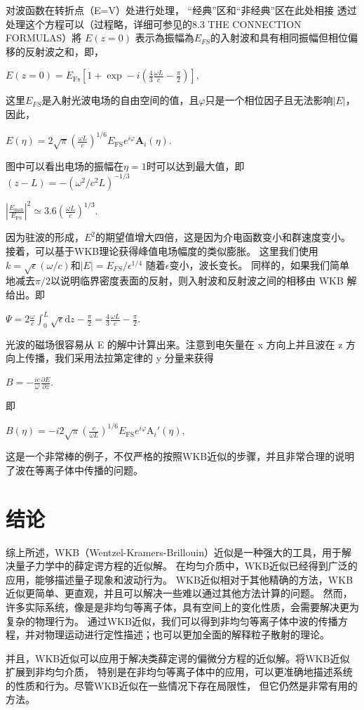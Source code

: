 \documentclass[12pt]{article}
\begin{document}
对波函数在转折点（E=V）处进行处理， “经典”区和“非经典”区在此处相接
透过处理这个方程可以（过程略，详细可参见\cite{griffiths_schroeter_2018}的8.3 THE CONNECTION FORMULAS）將 $E(z = 0)$ 表示為振幅為$E_{FS}$的入射波和具有相同振幅但相位偏移的反射波之和，即，
\begin{center}
    $\displaystyle E(z=0)=E_{\text{Fs}}\left[1+\exp-i\left(\frac{4}{3}\frac{\omega L}{c}-\frac{\pi}{2}\right)\right],$
\end{center}
这里$E_{FS}$是入射光波电场的自由空间的值，且$\varphi$只是一个相位因子且无法影响$|E|$，因此，
\begin{center}
    $\displaystyle E(\eta)=2\sqrt{\pi}\left(\frac{\omega L}{c}\right)^{1/6}E_{\text{FS}}e^{i\varphi}\mathbf{A}_i(\eta).$
\end{center}
图中可以看出电场的振幅在$\eta = 1$时可以达到最大值，即$(z-L) = -(\omega^2/c^2L)^{-1/3}$
\begin{center}
    $\displaystyle \left|\frac{E_{\max}}{E_{\text{FS}}}\right|^2\simeq3.6\left(\frac{\omega L}{c}\right)^{1/3}.$
\end{center}
因为驻波的形成，$E^2$的期望值增大四倍，这是因为介电函数变小和群速度变小。
接着，可以基于WKB理论获得峰值电场幅度的类似膨胀。 这里我们使用$k = \sqrt{\epsilon}(\omega/c)$和$|E| = E_{FS}/\epsilon^{1/4}$
随着$\epsilon$变小，波长变长。 
同样的，如果我们简单地减去$\pi/2$以说明临界密度表面的反射，则入射波和反射波之间的相移由 WKB 解给出。即
\begin{center}
    $\displaystyle \Psi=2\frac{\omega}{c}\int_{0}^{L}\sqrt{\epsilon}\mathrm{d}z-\frac{\pi}{2}=\frac{4}{3}\frac{\omega L}{c}-\frac{\pi}{2}.$
\end{center}

光波的磁场很容易从 E 的解中计算出来。注意到电矢量在 x 方向上并且波在 z 方向上传播，我们采用法拉第定律的 y 分量来获得
\begin{center}
    $\displaystyle B=-\frac{ic}{\omega}\frac{\partial E}{\partial z}.$
\end{center}即
\begin{center}
    $\displaystyle B(\eta)=-i2\sqrt{\pi}\left(\frac{c}{\omega L}\right)^{1/6}E_{\text{FS}}e^{i\varphi}\mathrm{A}_i'(\eta),$
\end{center}

这是一个非常棒的例子，不仅严格的按照WKB近似的步骤，并且非常合理的说明了波在等离子体中传播的问题。

\section{结论}
综上所述，WKB（Wentzel-Kramers-Brillouin）近似是一种强大的工具，用于解决量子力学中的薛定谔方程的近似解。
在均匀介质中，WKB近似已经得到广泛的应用，能够描述量子现象和波动行为。
WKB近似相对于其他精确的方法，WKB近似更简单、更直观，并且可以解决一些难以通过其他方法计算的问题。
然而，许多实际系统，像是是非均匀等离子体，具有空间上的变化性质，会需要解决更为复杂的物理行为。
通过WKB近似，我们可以得到非均匀等离子体中波的传播方程，并对物理运动进行定性描述；也可以更加全面的解释粒子散射的理论。

并且，WKB近似可以应用于解决类薛定谔的偏微分方程的近似解。将WKB近似扩展到非均匀介质，
特别是在非均匀等离子体中的应用，可以更准确地描述系统的性质和行为。尽管WKB近似在一些情况下存在局限性，
但它仍然是非常有用的方法。







\end{document}
